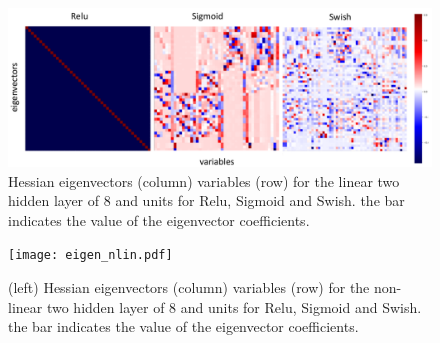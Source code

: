\documentclass[5p]{elsarticle}
\begin{document}
\begin{figure}[t!]
	\centering
		\includegraphics[width=\textwidth]{eigen_lin.pdf}
	
\caption{  \label{fig:eigvect} Hessian eigenvectors (column) variables (row) for the linear two hidden layer of 8 and units for Relu, Sigmoid and Swish. the bar indicates the value of the eigenvector coefficients.}
\end{figure}

\begin{figure}[t!]
	\centering
	\texttt{[image: eigen\_nlin.pdf]}
	
	\caption{  \label{fig:eigvect2}(left) Hessian eigenvectors (column) variables (row) for the non-linear two hidden layer of 8 and units for Relu, Sigmoid and Swish. the bar indicates the value of the eigenvector coefficients.}
\end{figure}
\end{document}
